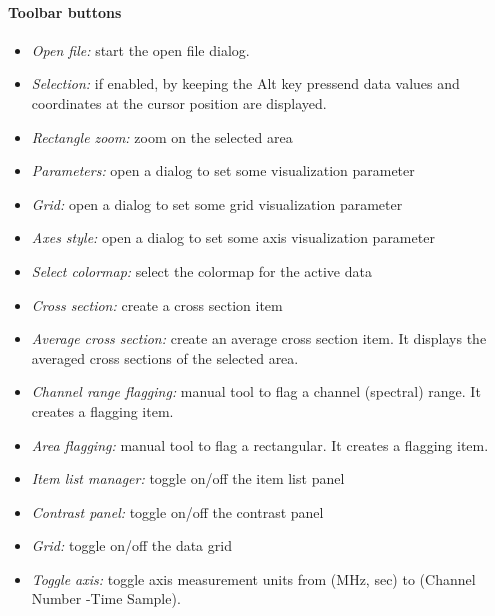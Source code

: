 \documentclass[letterpaper,10pt,english]{sphinxmanual}
\begin{document}
\paragraph{Toolbar buttons}
\label{gui:toolbar-buttons}\begin{itemize}
\item {} 
\emph{Open file:} start the open file dialog.

\item {} 
\emph{Selection:} if enabled, by keeping the Alt key pressend data
values and coordinates at the cursor position are displayed.

\item {} 
\emph{Rectangle zoom:} zoom on the selected area

\item {} 
\emph{Parameters:} open a dialog to set some visualization parameter

\item {} 
\emph{Grid:} open a dialog to set some grid visualization parameter

\item {} 
\emph{Axes style:} open a dialog to set some axis visualization parameter

\item {} 
\emph{Select colormap:} select the colormap for the active data

\item {} 
\emph{Cross section:} create a cross section item

\item {} 
\emph{Average cross section:} create an average cross section item. It displays the averaged cross
sections of the selected area.

\item {} 
\emph{Channel range flagging:} manual tool to flag a channel (spectral) range.  It creates a
flagging item.

\item {} 
\emph{Area flagging:} manual tool to flag a rectangular. It creates a flagging item.

\item {} 
\emph{Item list manager:} toggle on/off the item list panel

\item {} 
\emph{Contrast panel:} toggle on/off the contrast panel

\item {} 
\emph{Grid:} toggle on/off the data grid

\item {} 
\emph{Toggle axis:} toggle axis measurement units from (MHz, sec) to (Channel Number -Time Sample).


\end{itemize}
\end{document}
